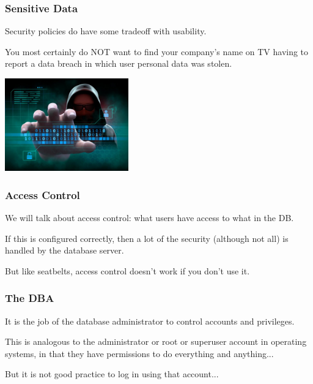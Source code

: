 \begin{frame}
\frametitle{Sensitive Data}

Security policies do have some tradeoff with usability.

You most certainly do NOT want to find your company's name on TV having to report a data breach in which user personal data was stolen.

\begin{center}
	\includegraphics[width=0.4\textwidth]{images/data-breach.png}
\end{center}

\end{frame}



\begin{frame}
\frametitle{Access Control}

We will talk about access control: what users have access to what in the DB. 

If this is configured correctly, then a lot of the security (although not all) is handled by the database server. 

But like seatbelts, access control doesn't work if you don't use it.

\end{frame}



\begin{frame}
\frametitle{The DBA}

It is the job of the database administrator to control accounts and privileges. 

This is analogous to the administrator or root or superuser account in operating systems, in that they have permissions to do everything and anything... 

But it is not good practice to log in using that account... 

\end{frame}


